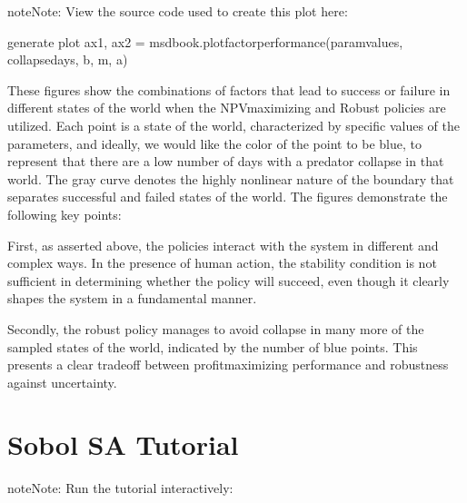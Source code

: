 \documentclass[letterpaper,10pt,english]{book}
\let\sphinxpxdimen\pdfpxdimen\else\newdimen\sphinxpxdimen
\begin{document}
\begin{sphinxadmonition}{note}{Note:}
\sphinxAtStartPar
{} View the source code used to create this plot here:  
\end{sphinxadmonition}

\begin{sphinxVerbatim}[commandchars=\\\{\}]
\PYGZsh{} generate plot
ax1, ax2 = msdbook.plot\PYGZus{}factor\PYGZus{}performance(param\PYGZus{}values, collapse\PYGZus{}days, b, m, a)
\end{sphinxVerbatim}

\noindent\sphinxincludegraphics[width=4800\sphinxpxdimen,height=2400\sphinxpxdimen]{{fishery_output_22_0}.png}

\sphinxAtStartPar
These figures show the combinations of factors that lead to success or
failure in different states of the world when the NPV\sphinxhyphen{}maximizing and
Robust policies are utilized. Each point is a state of the world,
characterized by specific values of the parameters, and ideally, we
would like the color of the point to be blue, to represent that there
are a low number of days with a predator collapse in that world. The
gray curve denotes the highly non\sphinxhyphen{}linear nature of the boundary that
separates successful and failed states of the world. The figures
demonstrate the following key points:

\sphinxAtStartPar
First, as asserted above, the policies interact with the system in
different and complex ways. In the presence of human action, the
stability condition is not sufficient in determining whether the policy
will succeed, even though it clearly shapes the system in a fundamental
manner.

\sphinxAtStartPar
Secondly, the robust policy manages to avoid collapse in many more of
the sampled states of the world, indicated by the number of blue points.
This presents a clear tradeoff between profit\sphinxhyphen{}maximizing performance and
robustness against uncertainty.


\section{Sobol SA Tutorial}
\label{\detokenize{A2_Jupyter_Notebooks:sobol-sa-tutorial}}
\begin{sphinxadmonition}{note}{Note:}
\sphinxAtStartPar
Run the tutorial interactively:  
\end{sphinxadmonition}
\end{document}

